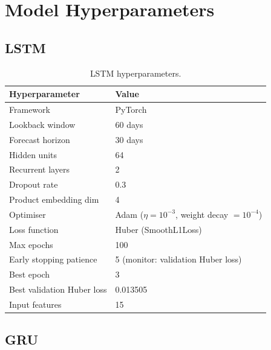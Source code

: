 \documentclass[12pt, a4paper]{article}
\begin{document}
\section{Model Hyperparameters}
\label{app:hyperparams}

\subsection{LSTM}

\begin{table}[H]
    \centering
    \caption{LSTM hyperparameters.}
    \label{tab:lstm_hp}
    \renewcommand{\arraystretch}{1.2}
    \begin{tabular}{@{}ll@{}}
        \toprule
        \textbf{Hyperparameter} & \textbf{Value} \\
        \midrule
        Framework                & PyTorch \\
        Lookback window          & 60 days \\
        Forecast horizon         & 30 days \\
        Hidden units             & 64 \\
        Recurrent layers         & 2 \\
        Dropout rate             & 0.3 \\
        Product embedding dim    & 4 \\
        Optimiser                & Adam ($\eta = 10^{-3}$, weight decay $= 10^{-4}$) \\
        Loss function            & Huber (SmoothL1Loss) \\
        Max epochs               & 100 \\
        Early stopping patience  & 5 (monitor: validation Huber loss) \\
        Best epoch               & 3 \\
        Best validation Huber loss & 0.013505 \\
        Input features           & 15 \\
        \bottomrule
    \end{tabular}
\end{table}

\subsection{GRU}
\end{document}
